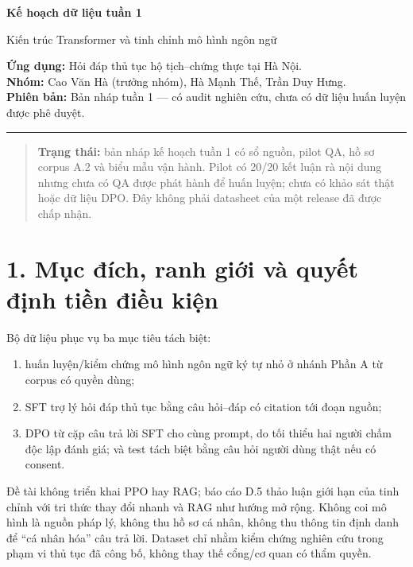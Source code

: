 \documentclass[11pt,a4paper]{article}
\providecommand{\tightlist}{\setlength{\itemsep}{0pt}\setlength{\parskip}{0pt}}
\begin{document}
{\LARGE\bfseries Kế hoạch dữ liệu tuần 1\par}
\vspace{4pt}
{\large Kiến trúc Transformer và tinh chỉnh mô hình ngôn ngữ\par}
\vspace{4pt}
\textbf{Ứng dụng:} Hỏi đáp thủ tục hộ tịch–chứng thực tại Hà Nội.\\
\textbf{Nhóm:} Cao Văn Hà (trưởng nhóm), Hà Mạnh Thế, Trần Duy Hưng.\\
\textbf{Phiên bản:} Bản nháp tuần 1 — có audit nghiên cứu, chưa có dữ liệu huấn luyện được phê duyệt.
\vspace{5pt}\hrule\vspace{8pt}
\begin{quote}
\textbf{Trạng thái:} bản nháp kế hoạch tuần 1 có sổ nguồn, pilot QA, hồ
sơ corpus A.2 và biểu mẫu vận hành. Pilot có 20/20 kết luận rà nội dung
nhưng chưa có QA được phát hành để huấn luyện; chưa có khảo sát thật
hoặc dữ liệu DPO. Đây không phải datasheet của một release đã được chấp
nhận.
\end{quote}

\section{1. Mục đích, ranh giới và quyết định tiền điều
kiện}\label{mux1ee5c-ux111uxedch-ranh-giux1edbi-vuxe0-quyux1ebft-ux111ux1ecbnh-tiux1ec1n-ux111iux1ec1u-kiux1ec7n}

Bộ dữ liệu phục vụ ba mục tiêu tách biệt:

\begin{enumerate}
\def\labelenumi{\arabic{enumi}.}
\tightlist
\item
  huấn luyện/kiểm chứng mô hình ngôn ngữ ký tự nhỏ ở nhánh Phần A từ
  corpus có quyền dùng;
\item
  SFT trợ lý hỏi đáp thủ tục bằng câu hỏi--đáp có citation tới đoạn
  nguồn;
\item
  DPO từ cặp câu trả lời SFT cho cùng prompt, do tối thiểu hai người
  chấm độc lập đánh giá; và test tách biệt bằng câu hỏi người dùng thật
  nếu có consent.
\end{enumerate}

Đề tài không triển khai PPO hay RAG; báo cáo D.5 thảo luận giới hạn của
tinh chỉnh với tri thức thay đổi nhanh và RAG như hướng mở rộng. Không
coi mô hình là nguồn pháp lý, không thu hồ sơ cá nhân, không thu thông
tin định danh để ``cá nhân hóa'' câu trả lời. Dataset chỉ nhằm kiểm
chứng nghiên cứu trong phạm vi thủ tục đã công bố, không thay thế
cổng/cơ quan có thẩm quyền.
\end{document}

